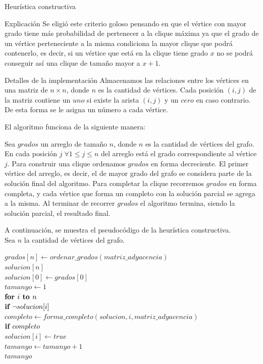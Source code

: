 \begin{section}{Heurística constructiva}
\begin{subsection}{Explicación}
			Se eligió este criterio goloso pensando en que el vértice con mayor grado tiene más probabilidad de pertenecer a la clique máxima ya que el grado de un vértice perteneciente a la misma condiciona la mayor clique que podrá contenerlo, es decir, si un vértice que está en la clique tiene grado $x$ no se podrá conseguir así una clique de tamaño mayor a $x+1$.
		\end{subsection}
		\begin{subsection}{Detalles de la implementación}
			Almacenamos las relaciones entre los vértices en una matriz de $n \times n$, donde $n$ es la cantidad de vértices. Cada posición $(i,j)$ de la matriz contiene un $uno$ si existe la arista $(i,j)$ y un $cero$ en caso contrario. De esta forma se le asigna un número a cada vértice.\VSP

			El algoritmo funciona de la siguiente manera:

			Sea $grados$ un arreglo de tamaño $n$, donde $n$ es la cantidad de vértices del grafo. En cada posición $j\; \forall 	1\leq j \leq n$ del arreglo está el grado correspondiente al vértice $j$.
			Para construir una clique ordenamos $grados$ en forma decreciente. El primer vértice del arreglo, es decir, el de mayor grado del grafo se considera parte de la solución final del algoritmo.
			Para completar la clique recorremos $grados$ en forma completa, y cada vértice que forma un completo con la solución parcial se agrega a la misma.
			Al terminar de recorrer $grados$ el algoritmo termina, siendo la solución parcial, el resultado final.

			A continuación, se muestra el pseudocódigo de la heurística constructiva.\\

			Sea $n$ la cantidad de vértices del grafo.

			\begin{pseudo}
				\tab $grados[n] \leftarrow ordenar\_grados(matriz\_adyacencia)$\\
				\tab $solucion[n]$\\
				\tab $solucion[0] \leftarrow grados[0]$\\
				\tab $tamanyo \leftarrow 1$\\
				\tab $\textbf{for } i \textbf{ to } n$\\
				\tab \tab $\textbf{if } \neg solucion[i]$\\
				\tab \tab \tab $completo \leftarrow forma\_completo(solucion,i,matriz\_adyacencia)$\\
				\tab \tab \tab $\textbf{if } completo$\\
				\tab \tab \tab \tab $solucion[i] \leftarrow true$\\
				\tab \tab \tab \tab $tamanyo \leftarrow tamanyo + 1$\\
				\RET $tamanyo$\\
			\end{pseudo}


\end{subsection}
\end{section}
